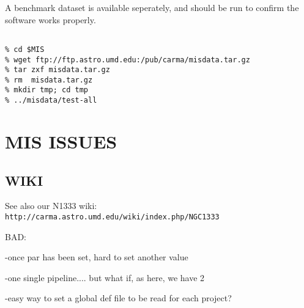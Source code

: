 \documentclass[preprint]{aastex} %
\begin{document}
A benchmark dataset is available seperately, and should be run
to confirm the software works properly.
\footnotesize
\begin{verbatim}

% cd $MIS
% wget ftp://ftp.astro.umd.edu:/pub/carma/misdata.tar.gz
% tar zxf misdata.tar.gz
% rm  misdata.tar.gz
% mkdir tmp; cd tmp
% ../misdata/test-all

\end{verbatim}
\normalsize

\section{MIS ISSUES}

\subsection{WIKI}
See also our
N1333 wiki: {\tt http://carma.astro.umd.edu/wiki/index.php/NGC1333}

BAD:

-once par has been set, hard to set another value

-one single pipeline....  but what if, as here, we have 2

-easy way to set a global def file to be read for each project?
\end{document}
